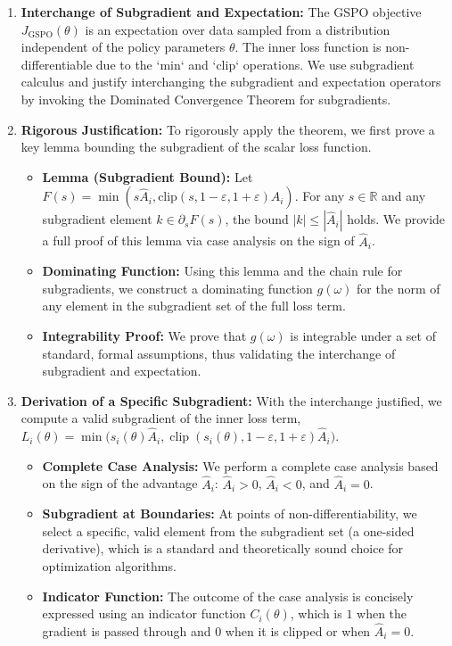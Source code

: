 \documentclass{article}
\begin{document}
\begin{enumerate}
    \item \textbf{Interchange of Subgradient and Expectation:} The GSPO objective $J_{\text{GSPO}}(\theta)$ is an expectation over data sampled from a distribution independent of the policy parameters $\theta$. The inner loss function is non-differentiable due to the `min` and `clip` operations. We use subgradient calculus and justify interchanging the subgradient and expectation operators by invoking the Dominated Convergence Theorem for subgradients.

    \item \textbf{Rigorous Justification:} To rigorously apply the theorem, we first prove a key lemma bounding the subgradient of the scalar loss function.
    \begin{itemize}
        \item \textbf{Lemma (Subgradient Bound):} Let $F(s) = \min(s \hat{A}_i, \text{clip}(s, 1-\varepsilon, 1+\varepsilon) \hat{A}_i)$. For any $s \in \mathbb{R}$ and any subgradient element $k \in \partial_s F(s)$, the bound $|k| \le |\hat{A}_i|$ holds. We provide a full proof of this lemma via case analysis on the sign of $\hat{A}_i$.  
        \item \textbf{Dominating Function:} Using this lemma and the chain rule for subgradients, we construct a dominating function $g(\omega)$ for the norm of any element in the subgradient set of the full loss term.
        \item \textbf{Integrability Proof:} We prove that $g(\omega)$ is integrable under a set of standard, formal assumptions, thus validating the interchange of subgradient and expectation.
    \end{itemize}

    \item \textbf{Derivation of a Specific Subgradient:} With the interchange justified, we compute a valid subgradient of the inner loss term, $L_i(\theta) = \min\!\bigl(s_i(\theta)\hat{A}_i,\operatorname{clip}(s_i(\theta),1-\varepsilon,1+\varepsilon)\hat{A}_i\bigr)$.  
    \begin{itemize}
        \item \textbf{Complete Case Analysis:} We perform a complete case analysis based on the sign of the advantage $\hat{A}_i$: $\hat{A}_i > 0$, $\hat{A}_i < 0$, and $\hat{A}_i = 0$.  
        \item \textbf{Subgradient at Boundaries:} At points of non-differentiability, we select a specific, valid element from the subgradient set (a one-sided derivative), which is a standard and theoretically sound choice for optimization algorithms.  
        \item \textbf{Indicator Function:} The outcome of the case analysis is concisely expressed using an indicator function $C_i(\theta)$, which is $1$ when the gradient is passed through and $0$ when it is clipped or when $\hat{A}_i = 0$.
    \end{itemize}


\end{enumerate}
\end{document}

